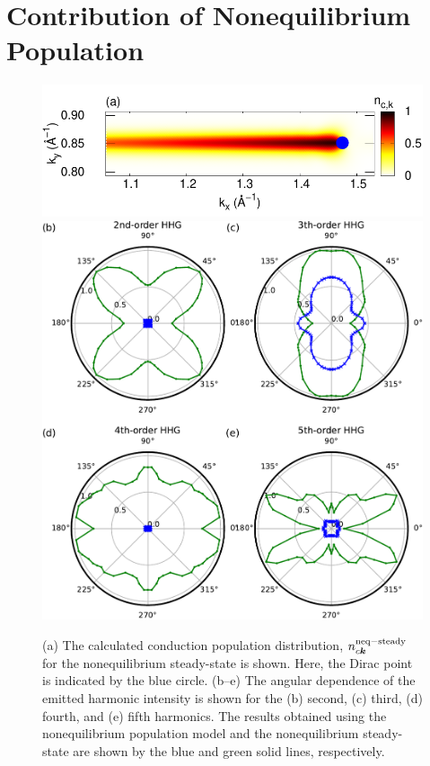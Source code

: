 \section{Contribution of Nonequilibrium Population}
\begin{figure}[ht]
\includegraphics[width=0.9\linewidth]{pic/pop_dist.pdf}
\includegraphics[width=0.9\linewidth]{pic/pop_c.pdf}
\caption{\label{fig:pop}
(a) The calculated conduction population distribution, $n^{\mathrm{neq-steady}}_{c\boldsymbol k}$ for the nonequilibrium steady-state is shown. Here, the Dirac point is indicated by the blue circle. (b--e) The angular dependence of the emitted harmonic intensity is shown for the (b) second, (c) third, (d) fourth, and (e) fifth harmonics. The results obtained using the nonequilibrium population model and the nonequilibrium steady-state are shown by the blue and green solid lines, respectively.
}
\end{figure}

